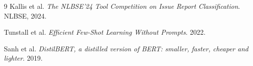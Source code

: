 \documentclass[11pt,a4paper]{article}
\begin{document}
\begin{thebibliography}{9}
Kallis et al. \emph{The NLBSE'24 Tool Competition on Issue Report
Classification}. NLBSE, 2024.

Tunstall et al. \emph{Efficient Few-Shot Learning Without Prompts}. 2022.

Sanh et al. \emph{DistilBERT, a distilled version of BERT: smaller, faster,
cheaper and lighter}. 2019.
\end{thebibliography}
\end{document}
